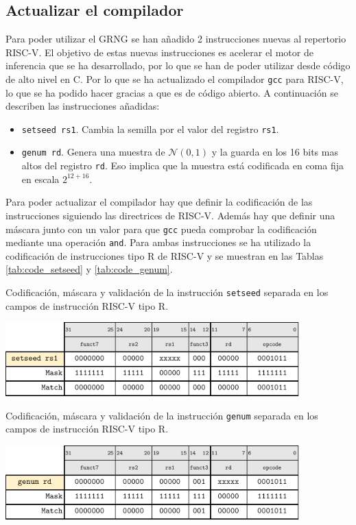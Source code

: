 \subsection{Actualizar el compilador}

Para poder utilizar el GRNG se han añadido 2 instrucciones nuevas al repertorio RISC-V. El objetivo de estas nuevas instrucciones es acelerar el motor de inferencia que se ha desarrollado, por lo que se han de poder utilizar desde código de alto nivel en C. Por lo que se ha actualizado el compilador \texttt{gcc} para RISC-V, lo que se ha podido hacer gracias a que es de código abierto. A continuación se describen las instrucciones añadidas:
\begin{itemize}
    \item \texttt{setseed rs1}. Cambia la semilla por el valor del registro \texttt{rs1}.
    \item \texttt{genum rd}. Genera una muestra de $\mathcal{N}(0,1)$ y la guarda en los 16 bits mas altos del registro \texttt{rd}. Eso implica que la muestra está codificada en coma fija en escala $2^{12 + 16}$.
\end{itemize}

Para poder actualizar el compilador hay que definir la codificación de las instrucciones siguiendo las directrices de RISC-V. Además hay que definir una máscara junto con un valor para que \texttt{gcc} pueda comprobar la codificación mediante una operación \texttt{and}. Para ambas instrucciones se ha utilizado la codificación de instrucciones tipo R de RISC-V y se muestran en las Tablas \ref{tab:code_setseed} y \ref{tab:code_genum}.

\begin{table}[h]
    \centering
    \caption{Codificación, máscara y validación de la instrucción \texttt{setseed} separada en los campos de instrucción RISC-V tipo R.}
    \label{tab:code_setseed}
    \includegraphics[width=0.85\textwidth]{root/Imagenes/5_riscv/code_setseed.pdf}
\end{table}

\begin{table}[h]
    \centering
    \caption{Codificación, máscara y validación de la instrucción \texttt{genum} separada en los campos de instrucción RISC-V tipo R.}
    \label{tab:code_genum}
    \includegraphics[width=0.85\textwidth]{root/Imagenes/5_riscv/code_genum.pdf}
\end{table}

